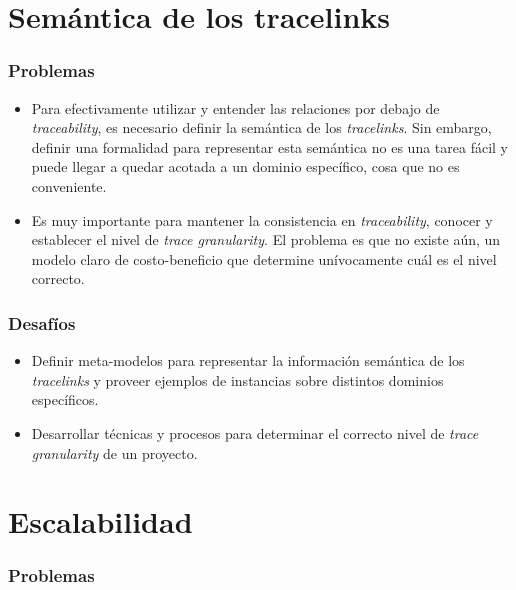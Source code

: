\documentclass[a4paper,12pt,twoside,spanish,openright]{book}
\begin{document}
\section{Semántica de los tracelinks}
\label{sec:SemanticaTracelinks}

\subsubsection{Problemas}

\begin{itemize}[label={$\times$}]

\item Para efectivamente utilizar y entender las relaciones por debajo de \textit{traceability}, es necesario definir la semántica de los \textit{tracelinks}. Sin embargo, definir una formalidad para representar esta semántica no es una tarea fácil y puede llegar a quedar acotada a un dominio específico, cosa que no es conveniente.

\item Es muy importante para mantener la consistencia en \textit{traceability}, conocer y establecer el nivel de \textit{trace granularity}. El problema es que no existe aún, un modelo claro de costo-beneficio que determine unívocamente cuál es el nivel correcto.

\end{itemize}

\subsubsection{Desafíos}

\begin{itemize}[label={\checkmark}]

\item Definir meta-modelos para representar la información semántica de los \textit{tracelinks} y proveer ejemplos de instancias sobre distintos dominios específicos.

\item Desarrollar técnicas y procesos para determinar el correcto nivel de \textit{trace granularity} de un proyecto.

\end{itemize}

\section{Escalabilidad}

\subsubsection{Problemas}
\end{document}
